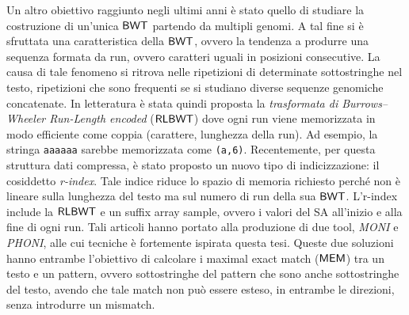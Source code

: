 \documentclass[a4paper,11pt, oneside,italian]{article}
\def\RLBWT{\mbox{\rm {\sf RLBWT}}}
\def\MEM{\mbox{\rm {\sf MEM}}}
\def\BWT{\mbox{\rm {\sf BWT}}}
\begin{document}
Un altro obiettivo raggiunto negli ultimi anni è stato quello di studiare la
costruzione di un'unica $\BWT$ partendo da multipli genomi.
A tal fine si è sfruttata una caratteristica della $\BWT$, ovvero la
tendenza a produrre una sequenza formata da run, ovvero caratteri uguali in
posizioni consecutive. La causa di tale fenomeno si ritrova nelle ripetizioni di
determinate sottostringhe nel testo, ripetizioni che sono frequenti se si
studiano diverse sequenze genomiche concatenate.
%
In letteratura è stata quindi proposta la \textit{trasformata di
  Burrows--Wheeler 
  Run-Length encoded} ($\RLBWT$) dove ogni run viene memorizzata in modo
efficiente 
come coppia (carattere, lunghezza della run). Ad esempio, la stringa
\texttt{aaaaaa} sarebbe memorizzata come \texttt{(a,6)}.
Recentemente, per questa struttura dati compressa, è stato proposto un nuovo
tipo di indicizzazione: il cosiddetto \textit{r-index}. Tale indice riduce lo
spazio di memoria richiesto perché non è lineare sulla lunghezza del testo ma
sul numero di run della sua $\BWT$.
L'r-index include la
$\RLBWT$ e un suffix array sample, ovvero i valori del SA all’inizio e alla fine
di ogni run. 
Tali articoli hanno portato alla produzione di due tool, \textit{MONI} e 
\textit{PHONI}, alle cui tecniche è fortemente ispirata questa tesi. Queste due
soluzioni hanno entrambe l'obiettivo di 
calcolare i maximal exact match ($\MEM$) tra un testo e un pattern, ovvero
sottostringhe del pattern che 
sono anche sottostringhe del testo, avendo che tale match non può essere esteso,
in entrambe le direzioni, senza introdurre un mismatch. 
\end{document}
